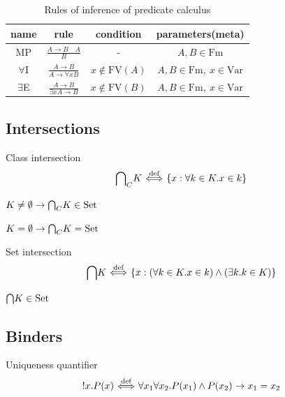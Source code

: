 \documentclass[10pt,a4paper]{article}
\begin{document}
\begin{table}[H]
\centering
\caption{Rules of inference of predicate calculus}
\label{tab:rulestab}
\begin{tabular}{|c|c|c|c|}
\hline
name & rule & condition & parameters(meta) \\ \hline
\hline
MP & \rule[-2.5ex]{0pt}{7ex} $\frac{A\to B\quad A}{B}$ & - & $A,B \in \textrm{Fm}$ \\ \hline
\hline
\rule[-2.5ex]{0pt}{7ex}
$\forall$I & $\frac{A\to B}{A\to \forall x B}$ & $x \notin \textrm{FV}(A)$ & $A,B \in \textrm{Fm},\ x \in \textrm{Var}$ \\ \hline
\hline
\rule[-2.5ex]{0pt}{7ex}
$\exists$E & $\frac{A\to B}{\exists x A\to B}$ & $x \notin \textrm{FV}(B)$ & $A,B \in \textrm{Fm},\ x \in \textrm{Var}$ \\ \hline
\end{tabular}
\end{table}

\subsection{Intersections}
\begin{definition} Class intersection
$${{\bigcap}_C} K {\stackrel{{\textrm{def}}}{\ \Longleftrightarrow\ }} \{x: \forall k\in K. x\in k\}$$
\end{definition}

\begin{exercise}
$K\neq \emptyset \to {{\bigcap}_C} K \in {\textrm{Set}}$
\end{exercise}

\begin{exercise}
$K=\emptyset \to {{\bigcap}_C} K = {\textrm{Set}}$
\end{exercise}

\begin{definition} Set intersection
$${\bigcap} K {\stackrel{{\textrm{def}}}{\ \Longleftrightarrow\ }} \{x: (\forall k\in K. x\in k)\land (\exists k.k\in K)\}$$
\end{definition}

\begin{exercise}
${\bigcap} K \in {\textrm{Set}}$
\end{exercise}
\subsection{Binders}
\begin{definition} Uniqueness quantifier
$$!x. P(x) {\stackrel{{\textrm{def}}}{\ \Longleftrightarrow\ }} \forall x_1 \forall x_2. P(x_1)\land P(x_2)\to x_1=x_2$$
\end{definition}
\end{document}
